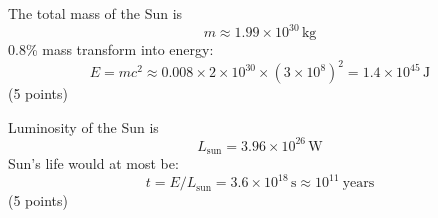 The total mass of the Sun is
\[
  m \approx 1.99 \times 10^{30}\,\mathrm{kg}
\]
0.8\% mass transform into energy:
\[
  E = mc^2 \approx 0.008 \times 2 \times 10^{30} \times (3 \times 10^{8})^2
    = 1.4 \times 10^{45}\,\mathrm{J}
\]
\hfill(5 points)

Luminosity of the Sun is
\[
  L_{\mathrm{sun}} = 3.96 \times 10^{26}\,\mathrm{W}
\]
Sun's life would at most be:
\[
  t = E / L_{\mathrm{sun}} = 3.6 \times 10^{18}\,\mathrm{s} \approx 10^{11}\ \text{years}
\]
\hfill(5 points)
